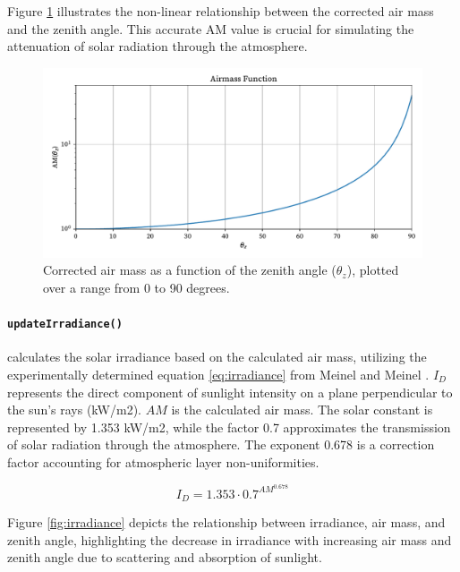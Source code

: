 \documentclass[draft, final]{vutinfth} %
\begin{document}
Figure \ref{fig:corrected-airmass} illustrates the non-linear relationship between the corrected air mass and the zenith angle. This accurate AM value is crucial for simulating the attenuation of solar radiation through the atmosphere.

\begin{figure}[h]
    \centering
    \includegraphics[width=\textwidth]{graphics/airmass.pdf}
    \caption{Corrected air mass as a function of the zenith angle ($\theta_z$), plotted over a range from 0 to 90 degrees.}
    \label{fig:corrected-airmass}
\end{figure}

\paragraph{\lstinline|updateIrradiance()|} calculates the solar irradiance based on the calculated air mass, utilizing the experimentally determined equation \ref{eq:irradiance} from Meinel and Meinel \cite{Meinel1976irradiance}. $I_D$ represents the direct component of sunlight intensity on a plane perpendicular to the sun's rays (kW/m2). $AM$ is the calculated air mass. The solar constant is represented by 1.353 kW/m2, while the factor 0.7 approximates the transmission of solar radiation through the atmosphere. The exponent 0.678 is a correction factor accounting for atmospheric layer non-uniformities.

\begin{equation} \label{eq:irradiance}
I_D = 1.353 \cdot 0.7^{AM^{0.678}}
\end{equation}

Figure \ref{fig:irradiance} depicts the relationship between irradiance, air mass, and zenith angle, highlighting the decrease in irradiance with increasing air mass and zenith angle due to scattering and absorption of sunlight.
\end{document}
